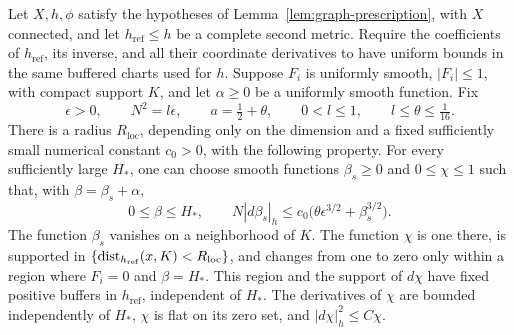 \begin{lemma}
\label{lem:graph-localization}
Let \(X,h,\phi\) satisfy the hypotheses of
Lemma~\ref{lem:graph-prescription}, with \(X\) connected, and let
\(h_{\mathrm{ref}}\le h\) be a complete second metric.  Require the
coefficients of \(h_{\mathrm{ref}}\), its inverse, and all their
coordinate derivatives to have uniform bounds in the same buffered
charts used for \(h\).
Suppose \(F_i\) is uniformly smooth, \(|F_i|\le1\), with compact
support \(K\), and let \(\alpha\ge0\) be a uniformly smooth
function.  Fix
\[
 \epsilon>0,\qquad N^2=l\epsilon,\qquad
 a=\tfrac12+\theta,\qquad 0<l\le1,\qquad l\le\theta\le\tfrac1{16}.
\]
There is a radius \(R_{\mathrm{loc}}\), depending only on the
dimension and a fixed sufficiently small numerical constant
\(c_0>0\), with the following property.  For every sufficiently
large \(H_*\), one can choose smooth functions
\(\beta_s\ge0\) and \(0\le\chi\le1\) such that, with
\(\beta=\beta_s+\alpha\),
\begin{equation}
 0\le\beta\le H_*,
 \qquad
 N|d\beta_s|_h
       \le c_0\bigl(\theta\epsilon^{3/2}+\beta_s^{3/2}\bigr).
 \label{eq:graph-spatial-cutoff}
\end{equation}
The function \(\beta_s\) vanishes on a neighborhood of \(K\).
The function \(\chi\) is one there, is supported in
\(\{\operatorname{dist}_{h_{\mathrm{ref}}}(x,K)<R_{\mathrm{loc}}\}\), and changes
from one to zero only within a region where \(F_i=0\) and
\(\beta=H_*\).  This region and the support of \(d\chi\) have fixed
positive buffers in \(h_{\mathrm{ref}}\), independent of \(H_*\).
The derivatives of \(\chi\) are bounded independently of \(H_*\),
\(\chi\) is flat on its zero set, and \(|d\chi|_h^2\le C\chi\).


\end{lemma}
